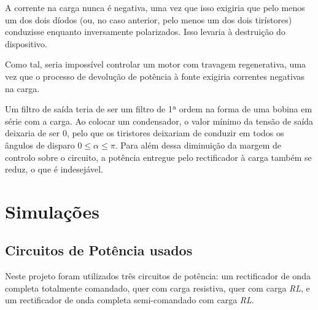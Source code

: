 \documentclass[a4paper,11pt]{article}
\numberwithin{equation}{section}
\begin{document}
A corrente na carga nunca é negativa, uma vez que isso exigiria que pelo menos um dos dois díodos (ou, no caso anterior, pelo menos um dos dois tirístores) conduzisse enquanto inversamente polarizados. Isso levaria à destruição do dispositivo.



Como tal, seria impossível controlar um motor com travagem regenerativa, uma vez que o processo de devolução de potência à fonte exigiria correntes negativas na carga.


Um filtro de saída teria de ser um filtro de 1ª ordem na forma de uma bobina em série com a carga. Ao colocar um condensador, o valor mínimo da tensão de saída deixaria de ser $0$, pelo que os tiristores deixariam de conduzir em todos os ângulos de disparo $0\leq \alpha \leq \pi$. Para além dessa diminuição da margem de controlo sobre o circuito, a potência entregue pelo rectificador à carga também se reduz, o que é indesejável.


\pagebreak
\section{Simulações}
\subsection{Circuitos de Potência usados}

Neste projeto foram utilizados três circuitos de potência: um rectificador de onda completa totalmente comandado, quer com carga resistiva, quer com carga \textit{RL}, e um rectificador de onda completa semi-comandado com carga \textit{RL}. 
\end{document}
